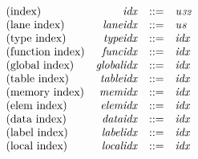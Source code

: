 $$
\begin{array}{@{}lrrl@{}l@{}}
\mbox{(index)} & {\mathit{idx}} &::=& {\mathit{u{\scriptstyle32}}} \\
\mbox{(lane index)} & {\mathit{laneidx}} &::=& {\mathit{u{\scriptstyle8}}} \\
\mbox{(type index)} & {\mathit{typeidx}} &::=& {\mathit{idx}} \\
\mbox{(function index)} & {\mathit{funcidx}} &::=& {\mathit{idx}} \\
\mbox{(global index)} & {\mathit{globalidx}} &::=& {\mathit{idx}} \\
\mbox{(table index)} & {\mathit{tableidx}} &::=& {\mathit{idx}} \\
\mbox{(memory index)} & {\mathit{memidx}} &::=& {\mathit{idx}} \\
\mbox{(elem index)} & {\mathit{elemidx}} &::=& {\mathit{idx}} \\
\mbox{(data index)} & {\mathit{dataidx}} &::=& {\mathit{idx}} \\
\mbox{(label index)} & {\mathit{labelidx}} &::=& {\mathit{idx}} \\
\mbox{(local index)} & {\mathit{localidx}} &::=& {\mathit{idx}} \\
\end{array}
$$

\vspace{1ex}

\vspace{1ex}

